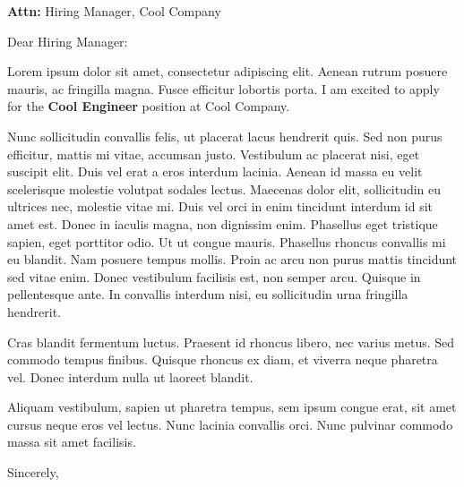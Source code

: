 \documentclass{letter}
\newcommand{\sendername}{John Doe}
\newcommand{\attn}{Hiring Manager}
\newcommand{\addressedto}{Hiring Manager}
\newcommand{\company}{Cool Company}
\newcommand{\position}{Cool Engineer}
\begin{document}
    \begin{letter}{\textbf{Attn:} \attn, \company}
    
        \opening{Dear \addressedto:}
        
        Lorem ipsum dolor sit amet, consectetur adipiscing elit. Aenean rutrum posuere mauris, ac fringilla magna. Fusce efficitur lobortis porta. I am excited to apply for the \textbf{\position} position at \company.
        
        Nunc sollicitudin convallis felis, ut placerat lacus hendrerit quis. Sed non purus efficitur, mattis mi vitae, accumsan justo. Vestibulum ac placerat nisi, eget suscipit elit. Duis vel erat a eros interdum lacinia. Aenean id massa eu velit scelerisque molestie volutpat sodales lectus. Maecenas dolor elit, sollicitudin eu ultrices nec, molestie vitae mi. Duis vel orci in enim tincidunt interdum id sit amet est. Donec in iaculis magna, non dignissim enim. Phasellus eget tristique sapien, eget porttitor odio. Ut ut congue mauris. Phasellus rhoncus convallis mi eu blandit. Nam posuere tempus mollis. Proin ac arcu non purus mattis tincidunt sed vitae enim. Donec vestibulum facilisis est, non semper arcu. Quisque in pellentesque ante. In convallis interdum nisi, eu sollicitudin urna fringilla hendrerit.
        
        Cras blandit fermentum luctus. Praesent id rhoncus libero, nec varius metus. Sed commodo tempus finibus. Quisque rhoncus ex diam, et viverra neque pharetra vel. Donec interdum nulla ut laoreet blandit. 
        
        Aliquam vestibulum, sapien ut pharetra tempus, sem ipsum congue erat, sit amet cursus neque eros vel lectus. Nunc lacinia convallis orci. Nunc pulvinar commodo massa sit amet facilisis.
        
        \closing{Sincerely,\\
                  \vspace{-2pt} \\
                 \fromname{\sendername}}
        
        \vspace{-50pt}
    
    \end{letter}
\end{document}
